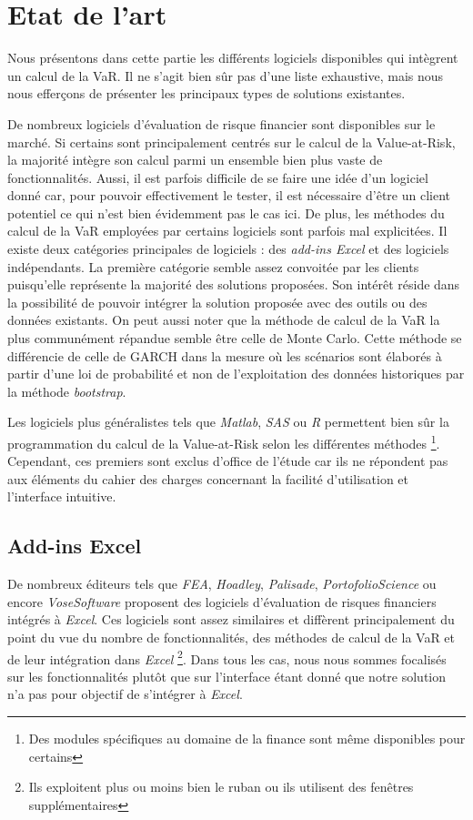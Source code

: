 \chapter{Etat de l'art}

	Nous présentons dans cette partie les différents logiciels disponibles qui intègrent un calcul de la VaR. Il ne s’agit bien sûr pas d’une liste exhaustive, mais nous nous efferçons de présenter les principaux types de solutions existantes.

	De nombreux logiciels d’évaluation de risque financier sont disponibles sur le marché. Si certains sont principalement centrés sur le calcul de la Value-at-Risk, la majorité intègre son calcul parmi un ensemble bien plus vaste de fonctionnalités. 
	Aussi, il est parfois difficile de se faire une idée d’un logiciel donné car, pour pouvoir effectivement le tester, il est nécessaire d’être un client potentiel ce qui n’est bien évidemment pas le cas ici. De plus, les méthodes du calcul de la VaR employées par certains logiciels sont parfois mal explicitées.
	Il existe deux catégories principales de logiciels : des \textit{add-ins Excel} et des logiciels indépendants. La première catégorie semble assez convoitée par les clients puisqu’elle représente la majorité des solutions proposées. Son intérêt réside dans la possibilité de pouvoir intégrer la solution proposée avec des outils ou des données existants.
	On peut aussi noter que la méthode de calcul de la VaR la plus communément répandue semble être celle de Monte Carlo. Cette méthode se différencie de celle de GARCH dans la mesure où les scénarios sont élaborés à partir d’une loi de probabilité et non de l’exploitation des données historiques par la méthode \textit{bootstrap}.

	Les logiciels plus généralistes tels que \textit{Matlab}, \textit{SAS} ou \textit{R} permettent bien sûr la programmation du calcul de la Value-at-Risk selon les différentes méthodes \footnote{Des modules spécifiques au domaine de la finance sont même disponibles pour certains}. Cependant, ces premiers sont exclus d’office de l’étude car ils ne répondent pas aux éléments du cahier des charges concernant la facilité d’utilisation et l’interface intuitive.


	\section{Add-ins Excel}

		De nombreux éditeurs tels que \textit{FEA}, \textit{Hoadley}, \textit{Palisade}, \textit{PortofolioScience} ou encore \textit{VoseSoftware} proposent des logiciels d’évaluation de risques financiers intégrés à \textit{Excel}. Ces logiciels sont assez similaires et diffèrent principalement du point du vue du nombre de fonctionnalités, des méthodes de calcul de la VaR et de leur intégration dans \textit{Excel} \footnote{Ils exploitent plus ou moins bien le ruban ou ils utilisent des fenêtres supplémentaires}. Dans tous les cas, nous nous sommes focalisés sur les fonctionnalités plutôt que sur l’interface étant donné que notre solution n’a pas pour objectif de s’intégrer à \textit{Excel}.

